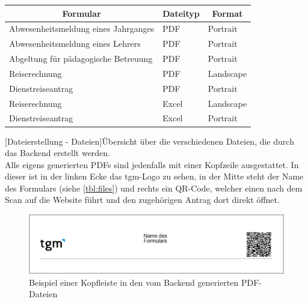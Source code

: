 \begin{table}
	\centering
	\begin{tabular}{|l|l|l|}
		\hline
		\multicolumn{1}{|c|}{\textbf{Formular}} & \multicolumn{1}{c|}{\textbf{Dateityp}} & \multicolumn{1}{c|}{\textbf{Format}} \\ \hline
		Abwesenheitsmeldung eines Jahrganges & PDF & Portrait \\ \hline
		Abwesenheitsmeldung eines Lehrers & PDF & Portrait \\ \hline
		Abgeltung für pädagogische Betreuung & PDF & Portrait \\ \hline
		Reiserechnung & PDF & Landscape \\ \hline
		Dienstreiseantrag & PDF & Portrait \\ \hline
		Reiserechnung & Excel & Landscape \\ \hline
		Dienstreiseantrag & Excel & Portrait \\ \hline
	\end{tabular}
\end{table}
[Dateierstellung - Dateien]{Übersicht über die verschiedenen Dateien, die durch das Backend erstellt werden.}	
\label{tbl:files}
~\\
Alle eigens generierten PDFs sind jedenfalls mit einer Kopfzeile ausgestattet. In dieser ist in der linken Ecke das tgm-Logo zu sehen, in der Mitte steht der Name des Formulars (siehe \autoref{tbl:files}) und rechts ein QR-Code, welcher einen nach dem Scan auf die Website führt und den zugehörigen Antrag dort direkt öffnet.

\begin{figure}[H]
	\centering
	\includegraphics[width=\linewidth]{images/mbeier_konzept/Kopfleiste_PDF_border}
	\caption[Kopfleiste PDF-Datei]{Beispiel einer Kopfleiste in den vom Backend generierten PDF-Dateien}
	\label{fig:kopfleiste-pdf}
\end{figure}

